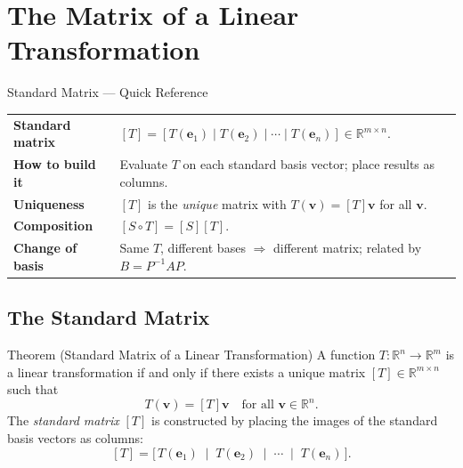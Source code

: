 
\section{The Matrix of a Linear Transformation}

\begin{toolkitbox}{Standard Matrix --- Quick Reference}
\begin{tabular}{@{}p{}p{}@{}}
\textbf{Standard matrix}      & $[T] = [T(\mathbf{e}_1)\mid T(\mathbf{e}_2)\mid\cdots\mid T(\mathbf{e}_n)] \in \mathbb{R}^{m\times n}$. \\[4pt]
\textbf{How to build it}       & Evaluate $T$ on each standard basis vector; place results as columns. \\[4pt]
\textbf{Uniqueness}            & $[T]$ is the \emph{unique} matrix with $T(\mathbf{v}) = [T]\mathbf{v}$ for all $\mathbf{v}$. \\[4pt]
\textbf{Composition}           & $[S \circ T] = [S][T]$. \\[4pt]
\textbf{Change of basis}       & Same $T$, different bases $\Rightarrow$ different matrix; related by $B = P^{-1}AP$. \\
\end{tabular}
\end{toolkitbox}

\subsection*{The Standard Matrix}

\begin{theorembox}{Theorem (Standard Matrix of a Linear Transformation)}
A function $T : \mathbb{R}^n \to \mathbb{R}^m$ is a linear transformation if and only if
there exists a unique matrix $[T] \in \mathbb{R}^{m \times n}$ such that
\[
  T(\mathbf{v}) = [T]\mathbf{v} \quad \text{for all } \mathbf{v} \in \mathbb{R}^n.
\]
The \emph{standard matrix} $[T]$ is constructed by placing the images of
the standard basis vectors as columns:
\[
  [T] = \bigl[\, T(\mathbf{e}_1) \;\mid\; T(\mathbf{e}_2) \;\mid\; \cdots \;\mid\; T(\mathbf{e}_n) \,\bigr].
\]
\end{theorembox}

